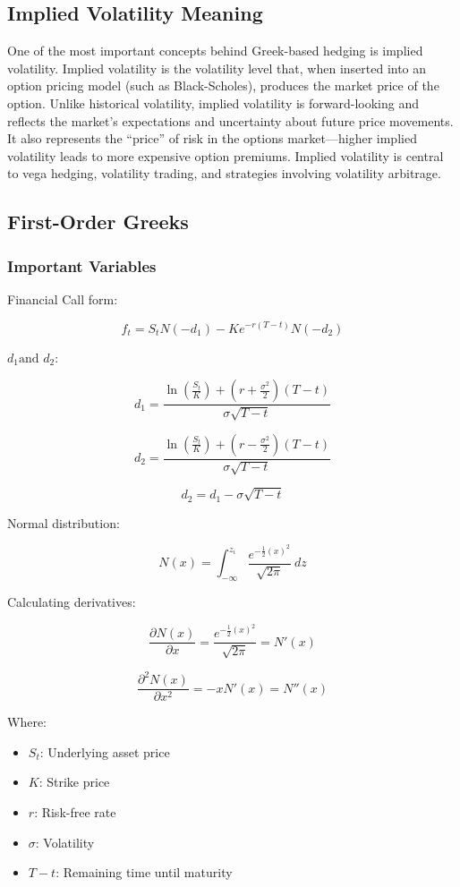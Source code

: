 \documentclass{article}
\begin{document}
\subsection{Implied Volatility Meaning}

One of the most important concepts behind Greek-based hedging is implied volatility. Implied volatility is the volatility level that, when inserted into an option pricing model (such as Black-Scholes), produces the market price of the option. Unlike historical volatility, implied volatility is forward-looking and reflects the market’s expectations and uncertainty about future price movements. It also represents the “price” of risk in the options market—higher implied volatility leads to more expensive option premiums. Implied volatility is central to vega hedging, volatility trading, and strategies involving volatility arbitrage.

\subsection{First-Order Greeks}

\subsubsection{Important Variables}

Financial Call form:

$$
f_t = S_t N(-d_1) - Ke^{-r(T-t)} N(-d_2)
$$

$d_1 \text{and } d_2$:

$$
d_1 = \frac{\ln \left({\frac{S_t}{K}} \right) + \left(r + \frac{\sigma^2}{2} \right)(T-t)}{\sigma \sqrt{T-t}}
$$

$$
d_2 = \frac{\ln \left({\frac{S_t}{K}} \right) + \left(r - \frac{\sigma^2}{2} \right)(T-t)}{\sigma \sqrt{T-t}}
$$

$$
d_2 = d_1 - \sigma \sqrt{T-t}
$$

Normal distribution:

$$
N(x) = \int_{-\infty}^{z_i} \frac{e^{-\frac{1}{2}(x)^2}}{\sqrt{2 \pi}} \ dz
$$

Calculating derivatives:

$$
\frac{\partial N(x)}{\partial x} = \frac{e^{-\frac{1}{2}(x)^2}}{\sqrt{2 \pi}} = N'(x)
$$

$$
\frac{\partial^2 N(x)}{\partial x^2} = -x N'(x) = N''(x)
$$

Where:

\begin{itemize}
    \item $S_t$: Underlying asset price
    \item $K$: Strike price
    \item $r$: Risk-free rate
    \item $\sigma$: Volatility
    \item $T-t$: Remaining time until maturity
\end{itemize}
\end{document}

